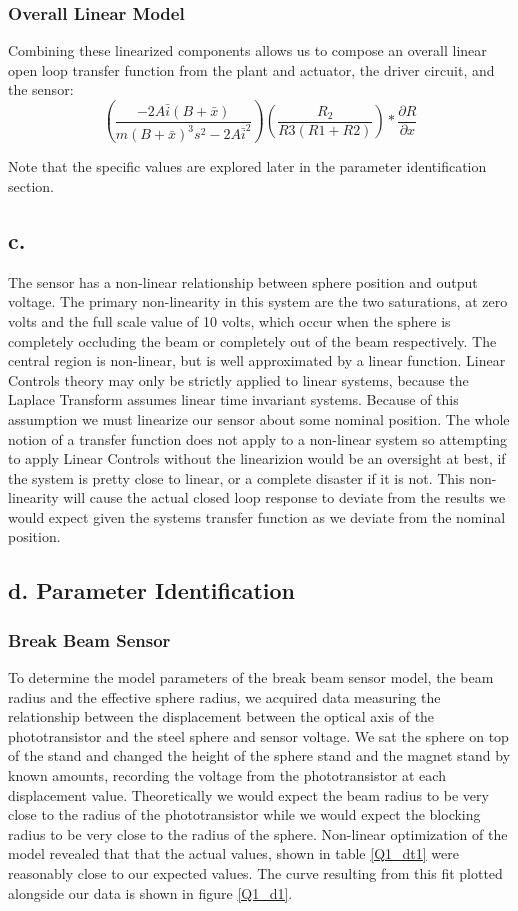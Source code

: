 \documentclass{article}
\theoremstyle{plain}
\theoremstyle{definition}
\theoremstyle{remark}
\begin{document}
\subsubsection*{Overall Linear Model}
Combining these linearized components allows us to compose an overall linear open loop transfer function from the plant and actuator, the driver circuit, and the sensor:
$$ \left(\frac{-2 A \bar{i} (B + \bar{x})}{m(B+\bar{x})^3 s^2 - 2 A \bar{i}^2}\right) \left(\frac{R_2}{R3(R1+R2)}\right)*\frac{\partial R}{\partial x} $$

Note that the specific values are explored later in the parameter identification section.

\subsection*{c.}
The sensor has a non-linear relationship between sphere position and output voltage.  The primary non-linearity in this system are the two saturations, at zero volts and the full scale value of 10 volts, which occur when the sphere is completely occluding the beam or completely out of the beam respectively.  The central region is non-linear, but is well approximated by a linear function.  Linear Controls theory may only be strictly applied to linear systems, because the Laplace Transform assumes linear time invariant systems.  Because of this assumption we must linearize our sensor about some nominal position.  The whole notion of a transfer function does not apply to a non-linear system so attempting to apply Linear Controls without the linearizion would be an oversight at best, if the system is pretty close to linear, or a complete disaster if it is not.  This non-linearity will cause the actual closed loop response to deviate from the results we would expect given the systems transfer function as we deviate from the nominal position.

\subsection*{d. Parameter Identification}

\subsubsection*{Break Beam Sensor}
To determine the model parameters of the break beam sensor model, the beam radius and the effective sphere radius, we acquired data measuring the relationship between the displacement between the optical axis of the phototransistor and the steel sphere and sensor voltage.  We sat the sphere on top of the stand and changed the height of the sphere stand and the magnet stand by known amounts, recording the voltage from the phototransistor at each displacement value.  Theoretically we would expect the beam radius to be very close to the radius of the phototransistor while we would expect the blocking radius to be very close to the radius of the sphere.  Non-linear optimization of the model revealed that that the actual values, shown in table \ref{Q1_dt1} were reasonably close to our expected values.  The curve resulting from this fit plotted alongside our data is shown in figure \ref{Q1_d1}.
\end{document}
